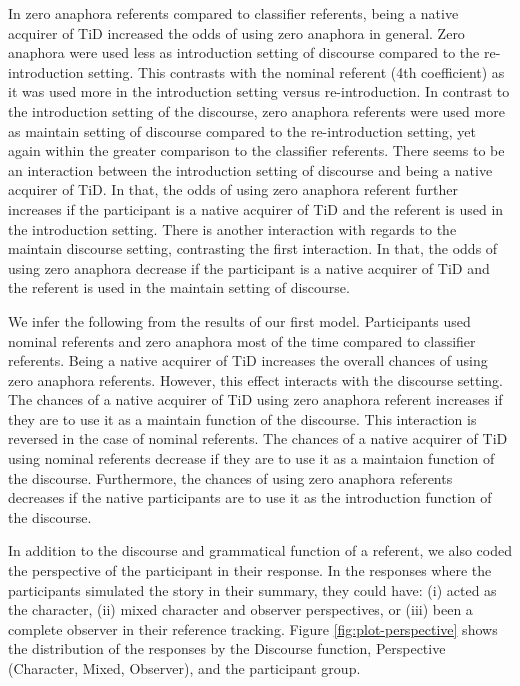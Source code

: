 \documentclass[
  english,
  doc,mask]{apa6}
\begin{document}
In zero anaphora referents compared to classifier referents, being a native acquirer of TiD increased the odds of using zero anaphora in general. Zero anaphora were used less as introduction setting of discourse compared to the re-introduction setting. This contrasts with the nominal referent (4th coefficient) as it was used more in the introduction setting versus re-introduction. In contrast to the introduction setting of the discourse, zero anaphora referents were used more as maintain setting of discourse compared to the re-introduction setting, yet again within the greater comparison to the classifier referents. There seems to be an interaction between the introduction setting of discourse and being a native acquirer of TiD. In that, the odds of using zero anaphora referent further increases if the participant is a native acquirer of TiD and the referent is used in the introduction setting. There is another interaction with regards to the maintain discourse setting, contrasting the first interaction. In that, the odds of using zero anaphora decrease if the participant is a native acquirer of TiD and the referent is used in the maintain setting of discourse.

We infer the following from the results of our first model. Participants used nominal referents and zero anaphora most of the time compared to classifier referents. Being a native acquirer of TiD increases the overall chances of using zero anaphora referents. However, this effect interacts with the discourse setting. The chances of a native acquirer of TiD using zero anaphora referent increases if they are to use it as a maintain function of the discourse. This interaction is reversed in the case of nominal referents. The chances of a native acquirer of TiD using nominal referents decrease if they are to use it as a maintaion function of the discourse. Furthermore, the chances of using zero anaphora referents decreases if the native participants are to use it as the introduction function of the discourse.

In addition to the discourse and grammatical function of a referent, we also coded the perspective of the participant in their response. In the responses where the participants simulated the story in their summary, they could have: (i) acted as the character, (ii) mixed character and observer perspectives, or (iii) been a complete observer in their reference tracking. Figure \ref{fig:plot-perspective} shows the distribution of the responses by the Discourse function, Perspective (Character, Mixed, Observer), and the participant group.
\end{document}

